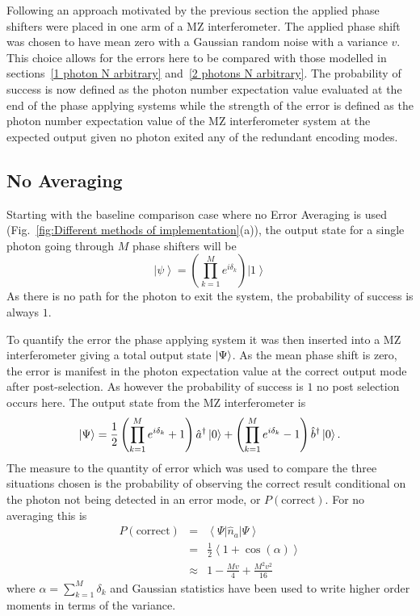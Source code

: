 \documentclass[aps,pra,twocolumn,superscriptaddress,numerical,floatfix]{revtex4-1}
\begin{document}
Following an approach motivated by the previous section the applied phase shifters were placed in one arm of a MZ interferometer. The applied phase shift was chosen to have mean zero with a Gaussian random noise with a variance $v$. This choice allows for the errors here to be compared with those modelled in sections~\ref{1 photon N arbitrary} and~\ref{2 photons N arbitrary}. The probability of success is now defined as the photon number expectation value evaluated at the end of the phase applying systems while the strength of the error is defined as the photon number expectation value of the MZ interferometer system at the expected output given no photon exited any of the redundant encoding modes. 


\subsection{No Averaging\label{No Averaging}}

Starting with the baseline comparison case where no Error Averaging is used (Fig.~\ref{fig:Different methods of implementation}(a)), the output state for a single photon going through $M$ phase shifters will be
\begin{equation}
\left|\psi\right\rangle =\left(\prod_{k=1}^{M}e^{i\delta_{k}}\right)\left|1\right\rangle \label{eq:noAvPhaseState}
\end{equation}
As there is no path for the photon to exit the system, the probability of success is always $1$.

To quantify the error the phase applying system it was then inserted into a MZ interferometer giving a total output state $\ket{\Psi}$.  As the mean phase shift is zero, the error is manifest in the photon expectation value at the correct output mode after post-selection. As however the probability of success is $1$ no post selection occurs here.  The output state from the MZ interferometer is
\begin{equation}
	\ket{\Psi} =\frac{1}{2}\left(\prod_{k=1}^{M}e^{i\delta_{k}}+1\right)\hat{a}^{\dagger}\ket{0}+\left(\prod_{k=1}^{M}e^{i\delta_{k}}-1\right)\hat{b}^{\dagger}\ket{0}. \label{eq:noAveIntState}
\end{equation}
The measure to the quantity of error which was used to compare the three situations chosen is the probability of observing the correct result conditional on the photon not being detected in an error mode, or $P(\textrm{correct})$. For no averaging this is
\begin{eqnarray}
P(\textrm{correct}) & = & \left\langle \Psi\right|\hat{n}_{a}\left|\Psi\right\rangle \nonumber \\
& = & \frac{1}{2}\left\langle 1+\cos\left(\alpha\right)\right\rangle \nonumber \\
& \approx & 1-\frac{Mv}{4}+\frac{M^{2}v^{2}}{16}\label{eq:ErrorNoAv1}
\end{eqnarray}
where $\alpha=\sum_{k=1}^{M}\delta_{k}$ and Gaussian statistics have been used to write higher order moments in terms of the variance.
\end{document}
